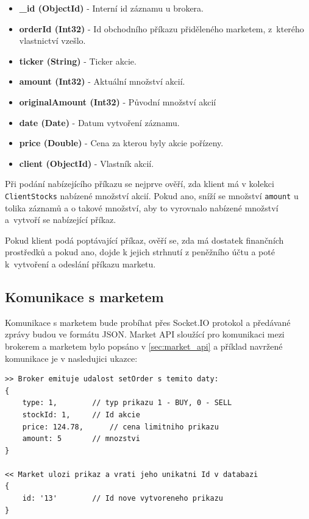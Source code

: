 \documentclass[thesis=M,czech]{FITthesis}[2012/06/26]
\begin{document}
\begin{itemize}

\item \textbf{\_id (ObjectId)} - Interní id záznamu u brokera.

\item \textbf{orderId (Int32)} - Id obchodního příkazu přiděleného marketem, z~kterého vlastnictví vzešlo.

\item \textbf{ticker (String)} - Ticker akcie.

\item \textbf{amount (Int32)} - Aktuální množství akcií.

\item \textbf{originalAmount (Int32)} - Původní množství akcií 

\item \textbf{date (Date)} - Datum vytvoření záznamu.

\item \textbf{price (Double)} - Cena za kterou byly akcie pořízeny. 

\item \textbf{client (ObjectId)} - Vlastník akcií.

\end{itemize}

	Při podání nabízejícího příkazu se nejprve ověří, zda klient má v kolekci \texttt{ClientStocks} nabízené množství akcií. Pokud ano, sníží se množství \texttt{amount} u tolika záznamů a o takové množství, aby to vyrovnalo nabízené množství a~vytvoří se nabízející příkaz.
	
	Pokud klient podá poptávající příkaz, ověří se, zda má dostatek finančních prostředků a pokud ano, dojde k jejich strhnutí z peněžního účtu a poté k~vytvoření a odeslání příkazu marketu.

\subsection{Komunikace s marketem}
\label{sec:broker_market_communication}

	Komunikace s marketem bude probíhat přes Socket.IO protokol a předávané zprávy budou ve formátu JSON. Market API sloužící pro komunikaci mezi brokerem a marketem bylo popsáno v \ref{sec:market_api} a příklad navržené komunikace je v nasledujici ukazce:
	
\begin{lstlisting}[basicstyle={\tiny\ttfamily}, frame=single] 
>> Broker emituje udalost setOrder s temito daty:
{
	type: 1,		// typ prikazu 1 - BUY, 0 - SELL
	stockId: 1,		// Id akcie
	price: 124.78,		// cena limitniho prikazu
	amount: 5		// mnozstvi 
}

<< Market ulozi prikaz a vrati jeho unikatni Id v databazi
{
	id: '13'		// Id nove vytvoreneho prikazu
}
\end{lstlisting}
	
\end{document}
